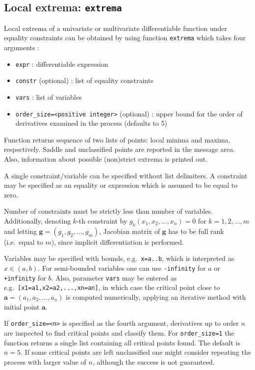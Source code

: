 \documentclass[a4paper,11pt]{book}
\begin{document}
\subsection{Local extrema: {\tt extrema}}

Local extrema of a univariate or multivariate differentiable function under equality constraints can be obtained by using function {\tt extrema} which takes four arguments :
\begin{itemize}
\item {\tt expr} : differentiable expression
\item {\tt constr} (optional) : list of equality constraints
\item {\tt vars} : list of variables
\item {\tt order\_size=<positive integer>} (optional) : upper bound for the order of derivatives examined in the process (defaults to 5)
\end{itemize}
Function returns sequence of two lists of points: local minima and maxima, respectively. Saddle and unclassified points are reported in the message area. Also, information about possible (non)strict extrema is printed out.

A single constraint/variable can be specified without list delimiters. A constraint may be specified as an equality or expression which is assumed to be equal to zero.

Number of constraints must be strictly less than number of variables. Additionally, denoting $ k $-th constraint by $ g_k(x_1,x_2,\dots,x_n)=0 $ for $ k=1,2,\dots,m $ and letting $ \mathbf{g}=(g_1,g_2,\dots,g_m) $, Jacobian matrix of $ \mathbf{g} $ has to be full rank (i.e.~equal to $ m $), since implicit differentiation is performed.

Variables may be specified with bounds, e.g.~{\tt x=a..b}, which is interpreted as $ x\in(a,b) $. For semi-bounded variables one can use {\tt -infinity} for $ a $ or {\tt +infinity} for $ b $. Also, parameter {\tt vars} may be entered as e.g.~{\tt [x1=a1,x2=a2,...,xn=an]}, in which case the critical point close to $ \mathbf{a}=(a_1,a_2,\dots,a_n) $ is computed numerically, applying an iterative method with initial point $ \mathbf{a} $.

If {\tt order\_size=<n>} is specified as the fourth argument, derivatives up to order $ n $ are inspected to find critical points and classify them. For {\tt order\_size=1} the function returns a single list containing all critical points found. The default is $ n=5 $. If some critical points are left unclassified one might consider repeating the process with larger value of $ n $, although the success is not guaranteed.
\end{document}
